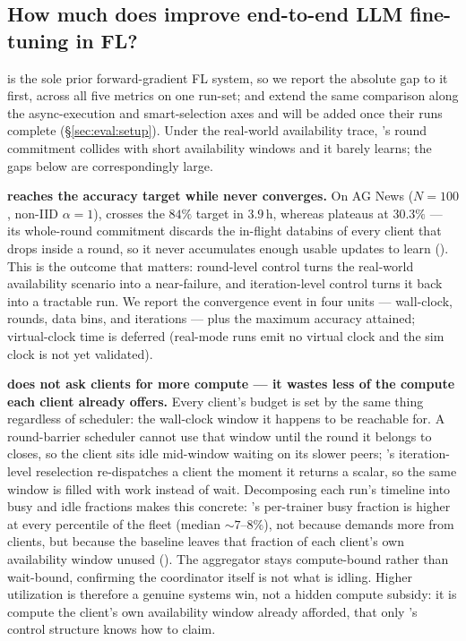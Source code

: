 \subsection{How much does \sys improve end-to-end LLM fine-tuning in FL?}
\label{sec:eval:sota}

\fwdllm{} is the sole prior forward-gradient FL system, so we report
the absolute gap to it first, across all five metrics on one run-set;
\fedbuffp{} and \felixp{} extend the same comparison along the
async-execution and smart-selection axes and will be added once their
runs complete (\S\ref{sec:eval:setup}). Under the real-world
availability trace, \fwdllm{}'s round commitment collides with short
availability windows and it barely learns; the gaps below are
correspondingly large.



\textbf{\sys{} reaches the accuracy target while \fwdllm{} never
converges.} On AG News ($N{=}100$, non-IID $\alpha{=}1$), \sys{}
crosses the $84\%$ target in $3.9$\,h, whereas \fwdllm{} plateaus at
$30.3\%$ --- its whole-round commitment discards the in-flight
databins of every client that drops inside a round, so it never
accumulates enough usable updates to learn ().
\label{sec:eval:tta} This is the outcome that matters: round-level
control turns the real-world availability scenario into a
near-failure, and iteration-level control turns it back into a
tractable run. We report the convergence event in four units ---
wall-clock, rounds, data bins, and iterations --- plus the maximum
accuracy attained; virtual-clock time is deferred (real-mode runs emit
no virtual clock and the sim clock is not yet validated).

\textbf{\sys{} does not ask clients for more compute --- it wastes
less of the compute each client already offers.} Every client's budget
is set by the same thing regardless of scheduler: the wall-clock
window it happens to be reachable for. A round-barrier scheduler
cannot use that window until the round it belongs to closes, so the
client sits idle mid-window waiting on its slower peers; \sys{}'s
iteration-level reselection re-dispatches a client the moment it
returns a scalar, so the same window is filled with work instead of
wait. Decomposing each run's timeline into busy and idle fractions
makes this concrete: \sys{}'s per-trainer busy fraction is higher at
every percentile of the fleet (median ${\sim}7$--$8\%$), not because
\sys{} demands more from clients, but because the baseline leaves that
fraction of each client's own availability window unused
(). \label{sec:eval:util} The aggregator stays
compute-bound rather than wait-bound, confirming the coordinator
itself is not what is idling. Higher utilization is therefore a
genuine systems win, not a hidden compute subsidy: it is compute the
client's own availability window already afforded, that only \sys{}'s
control structure knows how to claim.


